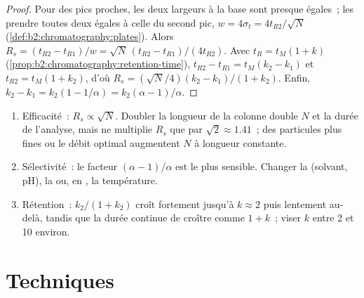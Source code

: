 \begin{proof}
Pour des pics proches, les deux largeurs à la base sont presque égales~; les prendre toutes deux égales à
celle du second pic,
$w = 4\sigma_t = 4t_{R2}/\sqrt N$ (\cref{def:b2:chromatography:plates}). Alors $R_s = (t_{R2} -
t_{R1})/w = \sqrt N\,(t_{R2} - t_{R1})/(4t_{R2})$. Avec $t_R = t_M(1 + k)$
(\cref{prop:b2:chromatography:retention-time}), $t_{R2} - t_{R1} = t_M(k_2 - k_1)$ et $t_{R2} =
t_M(1 + k_2)$, d'où $R_s = (\sqrt N/4)(k_2 - k_1)/(1 + k_2)$. Enfin, $k_2 - k_1 = k_2(1 - 1/\alpha) =
k_2(\alpha - 1)/\alpha$.
\end{proof}

\begin{method}\label{met:b2:chromatography:improve-resolution}
\begin{enumerate}
  \item Efficacité~: $R_s \propto \sqrt N$. Doubler la longueur de la colonne double $N$ et la durée de
        l'analyse, mais ne multiplie $R_s$ que par $\sqrt2 \approx 1.41$~; des particules plus fines ou le
        débit optimal augmentent $N$ à longueur constante.
  \item Sélectivité~: le facteur $(\alpha - 1)/\alpha$ est le plus sensible. Changer la 
        (solvant, pH), la  ou, en , la température.
  \item Rétention~: $k_2/(1+k_2)$ croît fortement jusqu'à $k \approx 2$ puis lentement au-delà, tandis que
        la durée continue de croître comme $1 + k$~; viser $k$ entre 2 et 10 environ.
\end{enumerate}
\end{method}

\section{Techniques}

